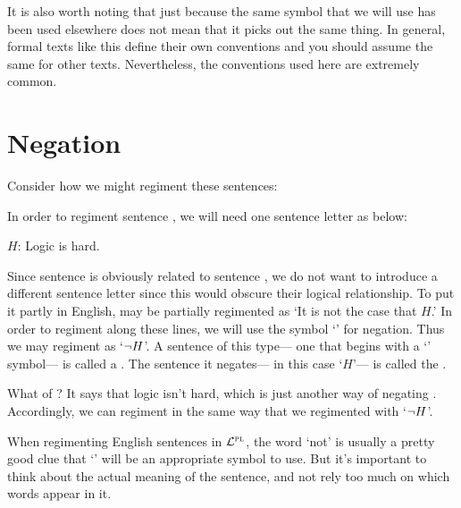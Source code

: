 It is also worth noting that just because the same symbol that we will use has been used elsewhere does not mean that it picks out the same thing.
In general, formal texts like this define their own conventions and you should assume the same for other texts.
Nevertheless, the conventions used here are extremely common.



\section{Negation}
  \label{sec.negation}

Consider how we might regiment these sentences:

\begin{earg} \label{logic}
\end{earg}

In order to regiment sentence , we will need one sentence letter as below:

\begin{ekey}
  \item[$H$:] Logic is hard.
\end{ekey}

Since sentence  is obviously related to sentence , we do not want to introduce a different sentence letter since this would obscure their logical relationship.
To put it partly in English,  may be partially regimented as `It is not the case that $H$.'
In order to regiment  along these lines, we will use the symbol `\enot' for negation.
Thus we may regiment  as `$\neg H$'.
A sentence of this type--- one that begins with a `\enot' symbol--- is called a .
The sentence it negates--- in this case `$H$'--- is called the .

What of ?
It says that logic isn't hard, which is just another way of negating .
Accordingly, we can regiment  in the same way that we regimented  with `$\neg H$'.

When regimenting English sentences in $\mathcal{L}^{\textsc{pl}}$, the word `not' is usually a pretty good clue that `\enot' will be an appropriate symbol to use.
But it's important to think about the actual meaning of the sentence, and not rely too much on which words appear in it.


